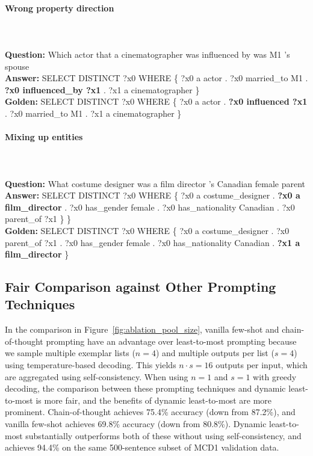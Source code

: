 \documentclass{article} \usepackage{iclr2022_conference,times}
\newcommand{\prompt}[1]{{\footnotesize \textsf{#1}}}
\begin{document}
\paragraph{Wrong property direction}
\prompt{\\
\\
\textbf{Question:} Which actor that a cinematographer was influenced by was M1 's spouse\\
\textbf{Answer:} SELECT DISTINCT ?x0 WHERE \{ ?x0 a actor . ?x0 married\_to M1 . \textbf{?x0 influenced\_by ?x1} . ?x1 a cinematographer \} \\
\textbf{Golden:} SELECT DISTINCT ?x0 WHERE \{ ?x0 a actor . \textbf{?x0 influenced ?x1} . ?x0 married\_to M1 . ?x1 a cinematographer \}
}

\paragraph{Mixing up entities}
\prompt{\\
\\
\textbf{Question:} What costume designer was a film director 's Canadian female parent\\
\textbf{Answer:} SELECT DISTINCT ?x0 WHERE \{ ?x0 a costume\_designer . \textbf{?x0 a film\_director} . ?x0 has\_gender female . ?x0 has\_nationality Canadian . ?x0 parent\_of ?x1 \} \} \\
\textbf{Golden:} SELECT DISTINCT ?x0 WHERE \{ ?x0 a costume\_designer . ?x0 parent\_of ?x1 . ?x0 has\_gender female . ?x0 has\_nationality Canadian . \textbf{?x1 a film\_director} \}
}

\subsection{Fair Comparison against Other Prompting Techniques \label{app:fair_compare}}

In the comparison in Figure~\ref{fig:ablation_pool_size}, vanilla few-shot and chain-of-thought prompting have an advantage over least-to-most prompting because we sample multiple exemplar lists ($n=4$) and multiple outputs per list ($s=4$) using temperature-based decoding. This yields $n \cdot s = 16$ outputs per input, which are aggregated using self-consistency. When using $n=1$ and $s=1$ with greedy decoding, the comparison between these prompting techniques and dynamic least-to-most is more fair, and the benefits of dynamic least-to-most are more prominent. Chain-of-thought achieves 75.4\% accuracy (down from 87.2\%), and vanilla few-shot achieves 69.8\% accuracy (down from 80.8\%). Dynamic least-to-most substantially outperforms both of these without using self-consistency, and achieves 94.4\% on the same 500-sentence subset of MCD1 validation data.
\end{document}
